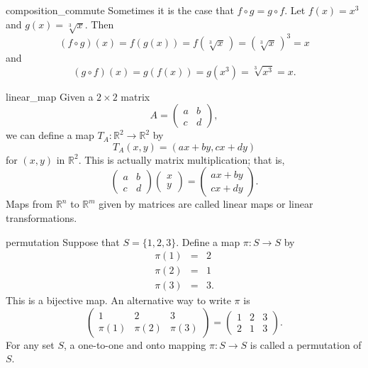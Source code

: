 \begin{example}{composition_commute}
Sometimes it is the case that $f \circ g= g \circ f$.  Let $f(x) = x^3$ and $g(x) = \sqrt[3]{x}$. Then 
$$
(f \circ g )(x) = f(g(x)) = f( \sqrt[3]{x}\, ) = (\sqrt[3]{x}\, )^3 = x
$$
and
$$
(g \circ f )(x) = g(f(x)) = g( x^3) = \sqrt[3]{ x^3} = x.
$$
\end{example}
 
\begin{example}{linear_map}
Given a $2 \times 2$ matrix
$$
A =
\begin{pmatrix}
a & b \\
c & d
\end{pmatrix},
$$
we can define a map $T_A : {\mathbb R}^2 \rightarrow {\mathbb R}^2$ by 
$$
T_A (x,y) = (ax + by, cx +dy)
$$
for $(x,y)$ in ${\mathbb R}^2$.  This is actually matrix multiplication; that is,
$$
\begin{pmatrix}
a & b \\
c & d
\end{pmatrix}
\begin{pmatrix}
x \\ y
\end{pmatrix}
=
\begin{pmatrix}
ax + by \\
cx +dy
\end{pmatrix}.
$$
Maps from ${\mathbb R}^n$ to ${\mathbb R}^m$ given by matrices are called {\bfi linear maps\/} or {\bfi linear transformations}.
\end{example}

\begin{example}{permutation}
Suppose that $S = \{ 1,2,3  \}$. Define a map $\pi :S\rightarrow S$ by 
\begin{eqnarray*}
\pi( 1 ) & = & 2 \\
\pi( 2 ) & = & 1 \\
\pi( 3 ) & = & 3.
\end{eqnarray*}
This is a bijective map.  An alternative way to  write $\pi$ is
$$
\begin{pmatrix}
1 & 2 & 3 \\
\pi(1) & \pi(2) & \pi(3)
\end{pmatrix}
=
\begin{pmatrix}
1 & 2 & 3 \\
2 & 1 & 3
\end{pmatrix}.
$$
For any set $S$, a one-to-one and onto mapping $\pi : S \rightarrow S$ is called a {\bfi permutation\/} of $S$. 
\end{example}

